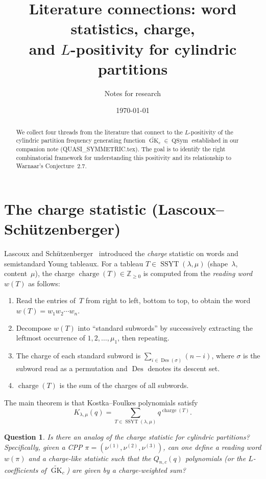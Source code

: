 \documentclass[11pt]{article}
\title{Literature connections: word statistics, charge,\\
and $L$-positivity for cylindric partitions}
\author{Notes for research}
\date{\today}
\newtheorem{question}[theorem]{Question}
\newcommand{\Z}{\mathbb{Z}}
\newcommand{\GK}{\operatorname{GK}}
\newcommand{\QSym}{\operatorname{QSym}}
\newcommand{\Des}{\operatorname{Des}}
\newcommand{\charge}{\operatorname{charge}}
\newcommand{\SSYT}{\operatorname{SSYT}}
\begin{document}
\maketitle

\begin{abstract}
We collect four threads from the literature that connect
to the $L$-positivity of the cylindric partition frequency
generating function $\widetilde{\GK}_c \in \QSym$
established in our companion note (QUASI\_SYMMETRIC.tex).
The goal is to identify the right combinatorial framework
for understanding this positivity and its relationship
to Warnaar's Conjecture~2.7.
\end{abstract}

\section{The charge statistic (Lascoux--Sch\"utzenberger)}
\label{sec:charge}

Lascoux and Sch\"utzenberger~\cite{LS78,LS79} introduced the
\emph{charge} statistic on words and semistandard Young tableaux.
For a tableau $T \in \SSYT(\lambda, \mu)$ (shape~$\lambda$,
content~$\mu$), the charge $\charge(T) \in \Z_{\geq 0}$ is
computed from the \emph{reading word} $w(T)$ as follows:

\begin{enumerate}
  \item Read the entries of~$T$ from right to left, bottom to top,
    to obtain the word $w(T) = w_1 w_2 \cdots w_n$.
  \item Decompose $w(T)$ into ``standard subwords'' by
    successively extracting the leftmost occurrence of
    $1, 2, \ldots, \mu_1$, then repeating.
  \item The charge of each standard subword is
    $\sum_{i \in \Des(\sigma)} (n - i)$, where $\sigma$ is
    the subword read as a permutation and $\Des$ denotes
    its descent set.
  \item $\charge(T)$ is the sum of the charges of all subwords.
\end{enumerate}

The main theorem is that Kostka--Foulkes polynomials satisfy
\[
  K_{\lambda,\mu}(q) = \sum_{T \in \SSYT(\lambda,\mu)} q^{\charge(T)}.
\]

\begin{question}
Is there an analog of the charge statistic for cylindric
partitions? Specifically, given a CPP
$\pi = (\nu^{(1)}, \nu^{(2)}, \nu^{(3)})$, can one define
a reading word $w(\pi)$ and a charge-like statistic such that
the $Q_{n,c}(q)$ polynomials (or the $L$-coefficients of
$\widetilde{\GK}_c$) are given by a charge-weighted sum?
\end{question}
\end{document}
